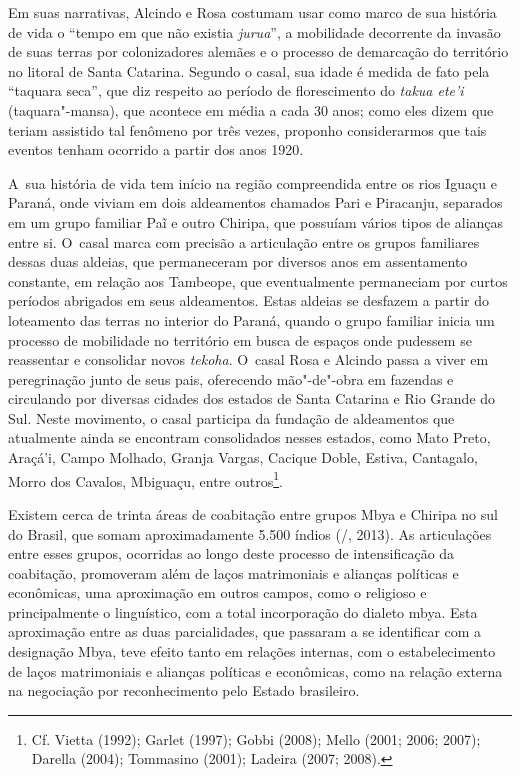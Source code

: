 Em suas narrativas, Alcindo e Rosa costumam usar como marco de sua
história de vida o ``tempo em que não existia \emph{jurua}'', a mobilidade
decorrente da invasão de suas terras por colonizadores alemães e o
processo de demarcação do território no litoral de Santa Catarina.
Segundo o casal, sua idade é medida de fato pela ``taquara seca'',
que diz respeito ao período de florescimento do \emph{takua ete’i}
(taquara"-mansa), que acontece em média a cada 30 anos; como eles dizem
que teriam assistido tal fenômeno por três vezes, proponho
considerarmos que tais eventos tenham ocorrido a partir dos anos 1920.

A~sua história de vida tem início na região compreendida entre os rios
Iguaçu e Paraná, onde viviam em dois aldeamentos chamados Pari e
Piracanju, separados em um grupo familiar Paĩ e
outro Chiripa, que possuíam vários tipos de alianças entre si. O~casal
marca com precisão a articulação entre os grupos familiares dessas duas
aldeias, que permaneceram por diversos anos em assentamento constante,
em relação aos Tambeope, que eventualmente permaneciam por curtos
períodos abrigados em seus aldeamentos. Estas aldeias se desfazem a
partir do loteamento das terras no interior do Paraná, quando o grupo
familiar inicia um processo de mobilidade no território em busca de
espaços onde pudessem se reassentar e consolidar novos \emph{tekoha}. O~casal
Rosa e Alcindo passa a viver em peregrinação junto de seus pais,
oferecendo mão"-de"-obra em fazendas e circulando por diversas cidades
dos estados de Santa Catarina e Rio Grande do Sul. Neste movimento, o
casal participa da fundação de aldeamentos que atualmente ainda se
encontram consolidados nesses estados, como Mato Preto, Araçá’i, Campo
Molhado, Granja Vargas, Cacique Doble, Estiva, Cantagalo, Morro dos
Cavalos, Mbiguaçu, entre outros\footnote{Cf. Vietta (1992); Garlet
(1997); Gobbi (2008); Mello (2001; 2006; 2007); Darella (2004);
Tommasino (2001); Ladeira (2007; 2008).}.

Existem cerca de trinta áreas de coabitação entre grupos Mbya e Chiripa
no sul do Brasil, que somam aproximadamente 5.500 índios (/,
2013). As articulações entre esses grupos, ocorridas ao longo deste processo
de intensificação da coabitação, promoveram além de laços matrimoniais
e alianças políticas e econômicas, uma aproximação em outros campos,
como o religioso e principalmente o linguístico, com a total
incorporação do dialeto mbya. Esta aproximação entre as duas
parcialidades, que passaram a se identificar com a designação Mbya,
teve efeito tanto em relações internas, com o estabelecimento de laços
matrimoniais e alianças políticas e econômicas, como na relação externa
na negociação por reconhecimento pelo Estado brasileiro.

